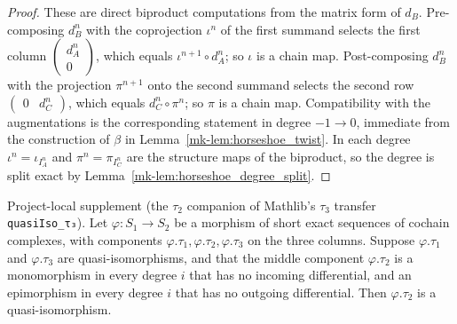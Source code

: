 \begin{proof}
  These are direct biproduct computations from the matrix form of \(d_B\). Pre-composing
  \(d_B^n\) with the coprojection \(\iota^n\) of the first summand selects the first
  column \(\begin{pmatrix} d_A^n \\ 0\end{pmatrix}\), which equals
  \(\iota^{n+1} \circ d_A^n\); so \(\iota\) is a chain map. Post-composing \(d_B^n\) with
  the projection \(\pi^{n+1}\) onto the second summand selects the second row
  \(\begin{pmatrix} 0 & d_C^n\end{pmatrix}\), which equals \(d_C^n \circ \pi^n\); so
  \(\pi\) is a chain map. Compatibility with the augmentations is the corresponding
  statement in degree \(-1 \to 0\), immediate from the construction of \(\beta\) in
  Lemma~\ref{mk-lem:horseshoe_twist}. In each degree \(\iota^n = \iota_{I_A^n}\) and
  \(\pi^n = \pi_{I_C^n}\) are the structure maps of the biproduct, so the degree is split
  exact by Lemma~\ref{mk-lem:horseshoe_degree_split}.
\end{proof}

\begin{lemma}\label{mk-lem:quasiIso_tau2}
  \leanok

  Project-local supplement (the \(\tau_2\) companion of Mathlib's \(\tau_3\) transfer
  \texttt{quasiIso\_τ₃}). Let \(\varphi : S_1 \to S_2\) be a morphism of short exact
  sequences of cochain complexes, with components \(\varphi.\tau_1, \varphi.\tau_2,
  \varphi.\tau_3\) on the three columns. Suppose \(\varphi.\tau_1\) and \(\varphi.\tau_3\)
  are quasi-isomorphisms, and that the middle component \(\varphi.\tau_2\) is a
  monomorphism in every degree \(i\) that has no incoming differential, and an
  epimorphism in every degree \(i\) that has no outgoing differential. Then
  \(\varphi.\tau_2\) is a quasi-isomorphism.
\end{lemma}

